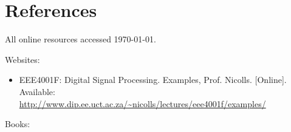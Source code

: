 \section*{References}
All online resources accessed \today. 
\bigskip
\bigskip

Websites:
\begin{itemize}
\item EEE4001F: Digital Signal Processing. Examples, Prof. Nicolls. [Online]. Available:\\ \url{http://www.dip.ee.uct.ac.za/~nicolls/lectures/eee4001f/examples/}
\end{itemize}

Books: